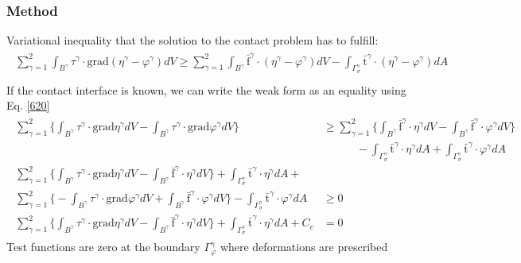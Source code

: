 \documentclass[12pt,3p]{article}
\numberwithin{equation}{section}
\begin{document}
\subsubsection{Method}
Variational inequality that the solution to the contact problem has to fulfill:
\begin{align}\label{620}
\begin{split}
\sum_{\gamma = 1}^2 \int_{B^\gamma} \tau^\gamma \cdot \text{grad} (\eta^{\gamma} - \varphi^\gamma) dV \geq \sum_{\gamma = 1}^2 \int_{B^\gamma} \bar{\text{f}}^\gamma \cdot (\eta^\gamma - \varphi^\gamma) dV - \int_{\Gamma_\sigma^\gamma} \bar{\text{t}}^\gamma \cdot ( \eta^\gamma - \varphi^\gamma) dA \\
\end{split}
\end{align}
If the contact interface is known, we can write the weak form as an equality using Eq. \ref{620}
\begin{align}\label{624}
\begin{split}
\sum_{\gamma = 1}^2 \Bigg\{ \int_{B^\gamma} \tau^\gamma \cdot \text{grad} \eta^\gamma dV -  \int_{B^\gamma} \tau^\gamma \cdot \text{grad} \varphi^\gamma dV \Bigg\} &\geq \sum_{\gamma = 1}^2 \Bigg\{ \int_{B^\gamma} \bar{\text{f}}^\gamma \cdot \eta^\gamma dV - \int_{B^\gamma} \bar{\text{f}}^\gamma \cdot \varphi^\gamma dV \Bigg\} \\
& \quad \quad \quad -\int_{\Gamma_\sigma^\gamma} \bar{\text{t}}^\gamma \cdot \eta^\gamma dA + \int_{\Gamma_\sigma^\gamma} \bar{\text{t}}^\gamma \cdot \varphi^\gamma dA \\
\sum_{\gamma = 1}^2 \Bigg\{ \int_{B^\gamma} \tau^\gamma \cdot \text{grad} \eta^{\gamma} dV -\int_{B^\gamma} \bar{\text{f}}^\gamma \cdot \eta^\gamma dV \Bigg\} + \int_{\Gamma_\sigma^\gamma} \bar{\text{t}}^\gamma \cdot \eta^\gamma dA + &\\
\sum_{\gamma = 1}^2 \Bigg\{ - \int_{B^\gamma} \tau^\gamma \cdot \text{grad} \varphi^{\gamma} dV +\int_{B^\gamma} \bar{\text{f}}^\gamma \cdot \varphi^\gamma dV \Bigg\} - \int_{\Gamma_\sigma^\gamma} \bar{\text{t}}^\gamma \cdot \varphi^\gamma dA &\geq 0 \\
\sum_{\gamma = 1}^2 \Bigg\{ \int_{B^\gamma} \tau^\gamma \cdot \text{grad} \eta^{\gamma} dV -\int_{B^\gamma} \bar{\text{f}}^\gamma \cdot \eta^\gamma dV \Bigg\} + \int_{\Gamma_\sigma^\gamma} \bar{\text{t}}^\gamma \cdot \eta^\gamma dA + C_c &= 0 
\end{split}
\end{align}
Test functions are zero at the boundary $\Gamma_\varphi^\gamma$ where deformations are prescribed
\end{document}
